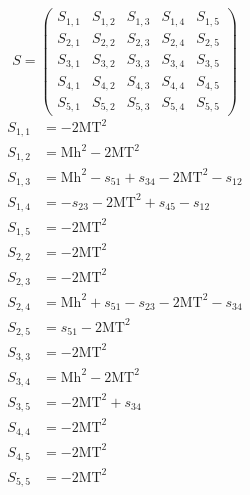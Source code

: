 \documentclass[a4paper]{article}
\begin{document}
\begin{equation}
S=\left(\begin{array}{ccccc}
   S_{1,1}&
   S_{1,2}&
   S_{1,3}&
   S_{1,4}&
   S_{1,5}\\
   S_{2,1}&
   S_{2,2}&
   S_{2,3}&
   S_{2,4}&
   S_{2,5}\\
   S_{3,1}&
   S_{3,2}&
   S_{3,3}&
   S_{3,4}&
   S_{3,5}\\
   S_{4,1}&
   S_{4,2}&
   S_{4,3}&
   S_{4,4}&
   S_{4,5}\\
   S_{5,1}&
   S_{5,2}&
   S_{5,3}&
   S_{5,4}&
   S_{5,5}\end{array}\right)
\end{equation}
\begin{subequations}
\begin{align}
   S_{1,1}&=-2\text{MT}^2\\
   S_{1,2}&=\text{Mh}^2-2\text{MT}^2\\
   S_{1,3}&=\text{Mh}^2-s_{51}+s_{34}-2\text{MT}^2-s_{12}\\
   S_{1,4}&=-s_{23}-2\text{MT}^2+s_{45}-s_{12}\\
   S_{1,5}&=-2\text{MT}^2\\
   S_{2,2}&=-2\text{MT}^2\\
   S_{2,3}&=-2\text{MT}^2\\
   S_{2,4}&=\text{Mh}^2+s_{51}-s_{23}-2\text{MT}^2-s_{34}\\
   S_{2,5}&=s_{51}-2\text{MT}^2\\
   S_{3,3}&=-2\text{MT}^2\\
   S_{3,4}&=\text{Mh}^2-2\text{MT}^2\\
   S_{3,5}&=-2\text{MT}^2+s_{34}\\
   S_{4,4}&=-2\text{MT}^2\\
   S_{4,5}&=-2\text{MT}^2\\
   S_{5,5}&=-2\text{MT}^2
\end{align}
\end{subequations}
\end{document}
